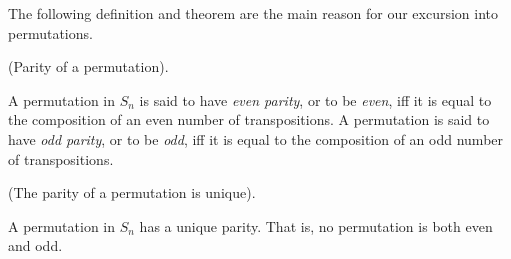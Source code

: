 The following definition and theorem are the main reason for our excursion into permutations.

\begin{defn}
    (Parity of a permutation).

    A permutation in $S_n$ is said to have \textit{even parity}, or to be \textit{even}, iff it is equal to the composition of an even number of transpositions. A permutation is said to have \textit{odd parity}, or to be \textit{odd}, iff it is equal to the composition of an odd number of transpositions.
\end{defn}

\begin{theorem}
    (The parity of a permutation is unique).

    A permutation in $S_n$ has a unique parity. That is, no permutation is both even and odd.
\end{theorem}

